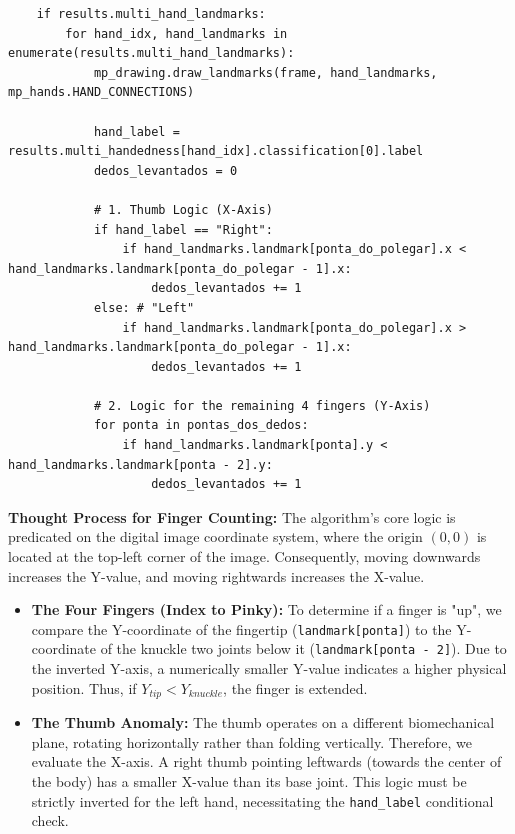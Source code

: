 \begin{lstlisting}
    if results.multi_hand_landmarks:
        for hand_idx, hand_landmarks in enumerate(results.multi_hand_landmarks):
            mp_drawing.draw_landmarks(frame, hand_landmarks, mp_hands.HAND_CONNECTIONS)

            hand_label = results.multi_handedness[hand_idx].classification[0].label
            dedos_levantados = 0

            # 1. Thumb Logic (X-Axis)
            if hand_label == "Right":
                if hand_landmarks.landmark[ponta_do_polegar].x < hand_landmarks.landmark[ponta_do_polegar - 1].x:
                    dedos_levantados += 1
            else: # "Left"
                if hand_landmarks.landmark[ponta_do_polegar].x > hand_landmarks.landmark[ponta_do_polegar - 1].x:
                    dedos_levantados += 1

            # 2. Logic for the remaining 4 fingers (Y-Axis)
            for ponta in pontas_dos_dedos:
                if hand_landmarks.landmark[ponta].y < hand_landmarks.landmark[ponta - 2].y:
                    dedos_levantados += 1
\end{lstlisting}

\textbf{Thought Process for Finger Counting:}
The algorithm's core logic is predicated on the digital image coordinate system, where the origin $(0,0)$ is located at the top-left corner of the image. Consequently, moving downwards increases the Y-value, and moving rightwards increases the X-value.

\begin{itemize}
    \item \textbf{The Four Fingers (Index to Pinky):} To determine if a finger is "up", we compare the Y-coordinate of the fingertip (\texttt{landmark[ponta]}) to the Y-coordinate of the knuckle two joints below it (\texttt{landmark[ponta - 2]}). Due to the inverted Y-axis, a numerically smaller Y-value indicates a higher physical position. Thus, if $Y_{tip} < Y_{knuckle}$, the finger is extended.
    \item \textbf{The Thumb Anomaly:} The thumb operates on a different biomechanical plane, rotating horizontally rather than folding vertically. Therefore, we evaluate the X-axis. A right thumb pointing leftwards (towards the center of the body) has a smaller X-value than its base joint. This logic must be strictly inverted for the left hand, necessitating the \texttt{hand\_label} conditional check.
\end{itemize}

